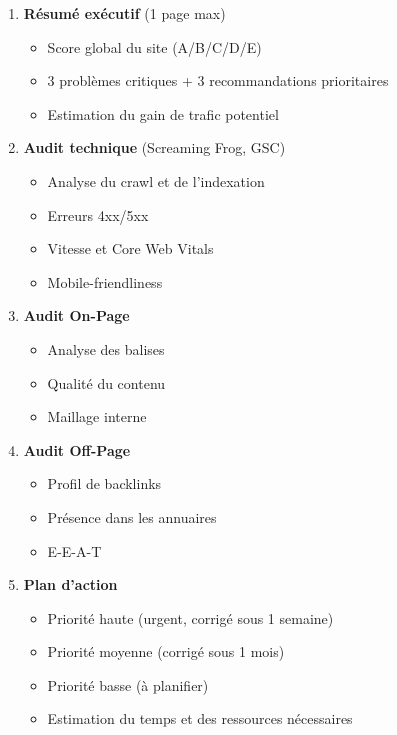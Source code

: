 \documentclass[12pt,a4paper]{report}
\begin{document}
\begin{enumerate}
\item \textbf{Résumé exécutif} (1 page max)
   \begin{itemize}
   \item Score global du site (A/B/C/D/E)
   \item 3 problèmes critiques + 3 recommandations prioritaires
   \item Estimation du gain de trafic potentiel
   \end{itemize}

\item \textbf{Audit technique} (Screaming Frog, GSC)
   \begin{itemize}
   \item Analyse du crawl et de l'indexation
   \item Erreurs 4xx/5xx
   \item Vitesse et Core Web Vitals
   \item Mobile-friendliness
   \end{itemize}

\item \textbf{Audit On-Page}
   \begin{itemize}
   \item Analyse des balises
   \item Qualité du contenu
   \item Maillage interne
   \end{itemize}

\item \textbf{Audit Off-Page}
   \begin{itemize}
   \item Profil de backlinks
   \item Présence dans les annuaires
   \item E-E-A-T
   \end{itemize}

\item \textbf{Plan d'action}
   \begin{itemize}
   \item Priorité haute (urgent, corrigé sous 1 semaine)
   \item Priorité moyenne (corrigé sous 1 mois)
   \item Priorité basse (à planifier)
   \item Estimation du temps et des ressources nécessaires
   \end{itemize}
\end{enumerate}
\end{document}
